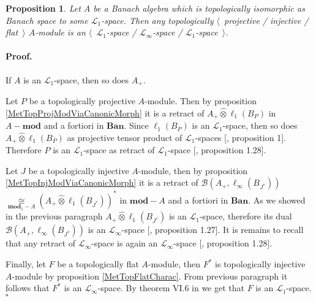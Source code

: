 \documentclass[12pt]{article}
\newcommand{\projtens}{\mathbin{\widehat{\otimes}}}
\newcommand{\isom}[1]{\mathop{\mathbin{\cong}}\limits_{#1}}
\newtheorem{proposition}[theorem]{Proposition}
\renewenvironment{proof}{\paragraph{Proof.}}{\hfill$\square$\medskip}
\begin{document}
\begin{proposition}\label{TopProjInjFlatModOverMthscrL1SpCharac} Let $A$ be a Banach algebra which is topologically isomorphic as Banach space to some $\mathscr{L}_1$-space. Then any topologically $\langle$~projective / injective / flat~$\rangle$ $A$-module is an $\langle$~$\mathscr{L}_1$-space / $\mathscr{L}_\infty$-space / $\mathscr{L}_1$-space~$\rangle$.
\end{proposition}
\begin{proof} If $A$ is an $\mathscr{L}_1$-space, then so does $A_+$. 

Let $P$ be a topologically projective $A$-module. Then by proposition \ref{MetTopProjModViaCanonicMorph} it is a retract of $A_+\projtens \ell_1(B_P)$ in $A-\mathbf{mod}$ and a fortiori in $\mathbf{Ban}$. Since $\ell_1(B_P)$ is an $\mathscr{L}_1$-space, then so does $A_+\projtens\ell_1(B_P)$ as projective tensor product of $\mathscr{L}_1$-spaces [\cite{GonzDPPInTensProd}, proposition 1]. Therefore $P$ is an $\mathscr{L}_1$-space as retract of $\mathscr{L}_1$-space [\cite{BourgNewClOfLpSp}, proposition 1.28].

Let $J$ be a topologically injective $A$-module, then by proposition \ref{MetTopInjModViaCanonicMorph} it is a retract of $\mathcal{B}(A_+,\ell_\infty(B_{J^*}))$ $\isom{\mathbf{mod}_1-A}(A_+\projtens\ell_1(B_{J^*}))^*$ in $\mathbf{mod}-A$ and a fortiori in $\mathbf{Ban}$. As we showed in the previous paragraph $A_+\projtens\ell_1(B_{J^*})$ is an $\mathscr{L}_1$-space, therefore its dual $\mathcal{B}(A_+,\ell_\infty(B_{J^*}))$ is an $\mathscr{L}_\infty$-space [\cite{BourgNewClOfLpSp}, proposition 1.27]. It is remains to recall that any retract of $\mathscr{L}_\infty$-space is again an $\mathscr{L}_\infty$-space [\cite{BourgNewClOfLpSp}, proposition 1.28].

Finally, let $F$ be a topologically flat $A$-module, then $F^*$ is topologically injective $A$-module by proposition \ref{MetTopFlatCharac}. From previous paragraph it follows that $F^*$ is an $\mathscr{L}_\infty$-space. By theorem VI.6 in \cite{StegRethNucOpL1LInfSp} we get that $F$ is an $\mathscr{L}_1$-space.
\end{proof}
\end{document}
